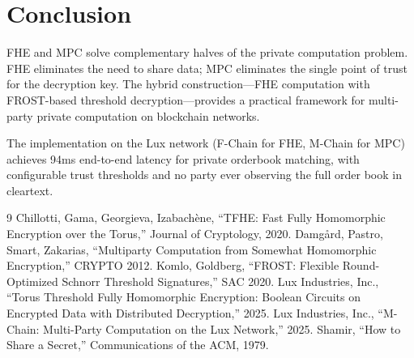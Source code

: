 \documentclass[11pt,a4paper]{article}
\begin{document}
\section{Conclusion}

FHE and MPC solve complementary halves of the private computation problem. FHE eliminates the need to share data; MPC eliminates the single point of trust for the decryption key. The hybrid construction---FHE computation with FROST-based threshold decryption---provides a practical framework for multi-party private computation on blockchain networks.

The implementation on the Lux network (F-Chain for FHE, M-Chain for MPC) achieves 94ms end-to-end latency for private orderbook matching, with configurable trust thresholds and no party ever observing the full order book in cleartext.

\begin{thebibliography}{9}
 Chillotti, Gama, Georgieva, Izabach\`{e}ne, ``TFHE: Fast Fully Homomorphic Encryption over the Torus,'' Journal of Cryptology, 2020.
 Damg\r{a}rd, Pastro, Smart, Zakarias, ``Multiparty Computation from Somewhat Homomorphic Encryption,'' CRYPTO 2012.
 Komlo, Goldberg, ``FROST: Flexible Round-Optimized Schnorr Threshold Signatures,'' SAC 2020.
 Lux Industries, Inc., ``Torus Threshold Fully Homomorphic Encryption: Boolean Circuits on Encrypted Data with Distributed Decryption,'' 2025.
 Lux Industries, Inc., ``M-Chain: Multi-Party Computation on the Lux Network,'' 2025.
 Shamir, ``How to Share a Secret,'' Communications of the ACM, 1979.
\end{thebibliography}
\end{document}
